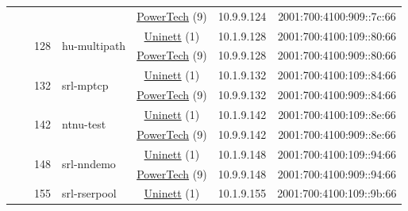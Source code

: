 \begin{small}
\begin{center}
\begin{longtable}{|c|c|c|c|c|c|c|c|}
  &  &  &  & \multicolumn{2}{|c|}{\tiny{\href{http://www.powertech.no}{PowerTech} (9)}} & \tiny{10.9.9.124} & \tiny{2001:700:4100:909::7c:66} \\* \cline{3-3}\cline{4-4}\cline{5-5}\cline{6-6}\cline{7-7}\cline{8-8}
  &  & \multirow{2}{*}{\tiny{128}} & \multicolumn{1}{|l|}{\multirow{2}{*}{\tiny{hu-multipath}}} & \multicolumn{2}{|c|}{\tiny{\href{https://www.uninett.no}{Uninett} (1)}} & \tiny{10.1.9.128} & \tiny{2001:700:4100:109::80:66} \\* \cline{5-5}\cline{6-6}\cline{7-7}\cline{8-8}
  &  &  &  & \multicolumn{2}{|c|}{\tiny{\href{http://www.powertech.no}{PowerTech} (9)}} & \tiny{10.9.9.128} & \tiny{2001:700:4100:909::80:66} \\* \cline{3-3}\cline{4-4}\cline{5-5}\cline{6-6}\cline{7-7}\cline{8-8}
  &  & \multirow{2}{*}{\tiny{132}} & \multicolumn{1}{|l|}{\multirow{2}{*}{\tiny{srl-mptcp}}} & \multicolumn{2}{|c|}{\tiny{\href{https://www.uninett.no}{Uninett} (1)}} & \tiny{10.1.9.132} & \tiny{2001:700:4100:109::84:66} \\* \cline{5-5}\cline{6-6}\cline{7-7}\cline{8-8}
  &  &  &  & \multicolumn{2}{|c|}{\tiny{\href{http://www.powertech.no}{PowerTech} (9)}} & \tiny{10.9.9.132} & \tiny{2001:700:4100:909::84:66} \\* \cline{3-3}\cline{4-4}\cline{5-5}\cline{6-6}\cline{7-7}\cline{8-8}
  &  & \multirow{2}{*}{\tiny{142}} & \multicolumn{1}{|l|}{\multirow{2}{*}{\tiny{ntnu-test}}} & \multicolumn{2}{|c|}{\tiny{\href{https://www.uninett.no}{Uninett} (1)}} & \tiny{10.1.9.142} & \tiny{2001:700:4100:109::8e:66} \\* \cline{5-5}\cline{6-6}\cline{7-7}\cline{8-8}
  &  &  &  & \multicolumn{2}{|c|}{\tiny{\href{http://www.powertech.no}{PowerTech} (9)}} & \tiny{10.9.9.142} & \tiny{2001:700:4100:909::8e:66} \\* \cline{3-3}\cline{4-4}\cline{5-5}\cline{6-6}\cline{7-7}\cline{8-8}
  &  & \multirow{2}{*}{\tiny{148}} & \multicolumn{1}{|l|}{\multirow{2}{*}{\tiny{srl-nndemo}}} & \multicolumn{2}{|c|}{\tiny{\href{https://www.uninett.no}{Uninett} (1)}} & \tiny{10.1.9.148} & \tiny{2001:700:4100:109::94:66} \\* \cline{5-5}\cline{6-6}\cline{7-7}\cline{8-8}
  &  &  &  & \multicolumn{2}{|c|}{\tiny{\href{http://www.powertech.no}{PowerTech} (9)}} & \tiny{10.9.9.148} & \tiny{2001:700:4100:909::94:66} \\* \cline{3-3}\cline{4-4}\cline{5-5}\cline{6-6}\cline{7-7}\cline{8-8}
  &  & \multirow{2}{*}{\tiny{155}} & \multicolumn{1}{|l|}{\multirow{2}{*}{\tiny{srl-rserpool}}} & \multicolumn{2}{|c|}{\tiny{\href{https://www.uninett.no}{Uninett} (1)}} & \tiny{10.1.9.155} & \tiny{2001:700:4100:109::9b:66} \\* \cline{5-5}\cline{6-6}\cline{7-7}\cline{8-8}

\end{longtable}
\end{center}
\end{small}
